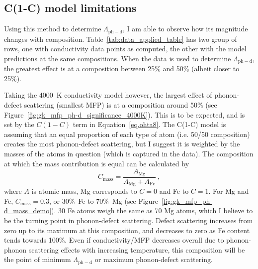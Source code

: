 \subsection{C(1-C) model limitations}

Using this method to determine $\Lambda_{\mathrm{ph-d}}$, I am able to observe how its magnitude changes with composition. Table~\ref{tab:data_applied_table} has two group of rows, one with conductivity data points as computed, the other with the model predictions at the same compositions. When the data is used to determine $\Lambda_{\mathrm{ph-d}}$, the greatest effect is at a composition between 25\% and 50\% (albeit closer to 25\%). 

Taking the 4000~K conductivity model however, the largest effect of phonon-defect scattering (smallest MFP) is at a composition around 50\% (see Figure~\ref{fig:gk_mfp_ph-d_significance_4000K}). This is to be expected, and is set by the $C \left (1-C \right)$ term in Equation~\ref{eq.ohta8}. The C(1-C) model is assuming that an equal proportion of each type of atom (i.e. 50/50 composition) creates the most phonon-defect scattering, but I suggest it is weighted by the masses of the atoms in question (which is captured in the data). The composition at which the mass contribution is equal can be calculated by
%
\begin{equation}
C_{\mathrm{mass}} = \frac{A_{\mathrm{Mg}}}{A_{\mathrm{Mg}} + A_{\mathrm{Fe}}}\ ,
\label{eq:mass_turnover_point}
\end{equation}
%
where $A$ is atomic mass, Mg corresponds to $C=0$ and Fe to $C=1$. For Mg and Fe, $C_{\mathrm{mass}} = 0.3$, or 30\%~Fe to 70\%~Mg (see Figure~\ref{fig:gk_mfp_ph-d_mass_demo}). 30 Fe atoms weigh the same as 70 Mg atoms, which I believe to be the turning point in phonon-defect scattering. Defect scattering increases from zero up to its maximum at this composition, and decreases to zero as Fe content tends towards 100\%. Even if conductivity/MFP decreases overall due to phonon-phonon scattering effects with increasing temperature, this composition will be the point of minimum $\Lambda_{\mathrm{ph-d}}$ or maximum phonon-defect scattering.



